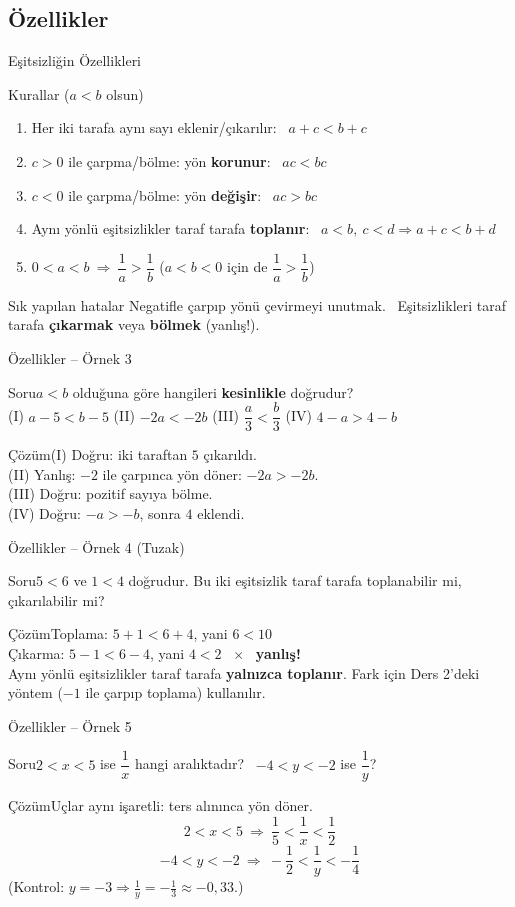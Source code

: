 \documentclass[aspectratio=169,11pt,handout]{beamer}
\newcommand{\soru}[3]{%
\begin{frame}{#1}
  \begin{block}{Soru}\large #2\end{block}
  \pause
  \begin{exampleblock}{Çözüm}\large #3\end{exampleblock}
\end{frame}}
\begin{document}
\subsection{Özellikler}
\begin{frame}{Eşitsizliğin Özellikleri}
\begin{block}{Kurallar (\(a<b\) olsun)}
\begin{enumerate}
\item Her iki tarafa aynı sayı eklenir/çıkarılır: \ \(a+c<b+c\)
\item \(c>0\) ile çarpma/bölme: yön \textbf{korunur}: \ \(ac<bc\)
\item \(c<0\) ile çarpma/bölme: yön \textbf{değişir}: \ \(ac>bc\)
\item Aynı yönlü eşitsizlikler taraf tarafa \textbf{toplanır}: \ \(a<b,\ c<d\Rightarrow a+c<b+d\)
\item \(0<a<b\ \Rightarrow\ \dfrac1a>\dfrac1b\) \quad (\(a<b<0\) için de \(\dfrac1a>\dfrac1b\))
\end{enumerate}
\end{block}
\begin{alertblock}{Sık yapılan hatalar}
Negatifle çarpıp yönü çevirmeyi unutmak. \ Eşitsizlikleri taraf tarafa \textbf{çıkarmak} veya \textbf{bölmek} (yanlış!).
\end{alertblock}
\end{frame}

\soru{Özellikler -- Örnek 3}
{\(a<b\) olduğuna göre hangileri \textbf{kesinlikle} doğrudur?\\
(I) \(a-5<b-5\) \quad (II) \(-2a<-2b\) \quad (III) \(\dfrac a3<\dfrac b3\) \quad (IV) \(4-a>4-b\)}
{(I) Doğru: iki taraftan \(5\) çıkarıldı.\\
(II) Yanlış: \(-2\) ile çarpınca yön döner: \(-2a>-2b\).\\
(III) Doğru: pozitif sayıya bölme.\\
(IV) Doğru: \(-a>-b\), sonra \(4\) eklendi.}

\soru{Özellikler -- Örnek 4 (Tuzak)}
{\(5<6\) ve \(1<4\) doğrudur. Bu iki eşitsizlik taraf tarafa toplanabilir mi, çıkarılabilir mi?}
{Toplama: \(5+1<6+4\), yani \(6<10\) \ \checkmark\\[3pt]
Çıkarma: \(5-1<6-4\), yani \(4<2\) \ \(\times\) \ \textbf{yanlış!}\\[3pt]
Aynı yönlü eşitsizlikler taraf tarafa \textbf{yalnızca toplanır}. Fark için Ders 2'deki yöntem (\(-1\) ile çarpıp toplama) kullanılır.}

\soru{Özellikler -- Örnek 5}
{\(2<x<5\) ise \(\dfrac1x\) hangi aralıktadır? \ \(-4<y<-2\) ise \(\dfrac1y\)?}
{Uçlar aynı işaretli: ters alınınca yön döner.
\[2<x<5\ \Rightarrow\ \frac15<\frac1x<\frac12\]
\[-4<y<-2\ \Rightarrow\ -\frac12<\frac1y<-\frac14\]
(Kontrol: \(y=-3\Rightarrow \frac1y=-\frac13\approx-0{,}33\).)}
\end{document}
